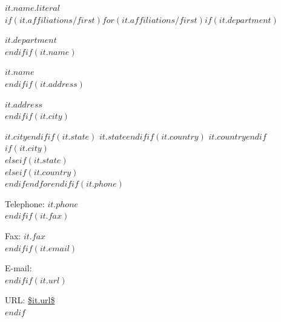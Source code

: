 $it.name.literal$\\$if(it.affiliations/first)$$for(it.affiliations/first)$$if(it.department)$

$it.department$\\$endif$$if(it.name)$

$it.name$\\$endif$$if(it.address)$

$it.address$\\$endif$$if(it.city)$

$it.city$$endif$$if(it.state)$ $it.state$$endif$$if(it.country)$ $it.country$$endif$$if(it.city)$\\$elseif(it.state)$\\$elseif(it.country)$\\$endif$$endfor$$endif$$if(it.phone)$

Telephone: $it.phone$\\$endif$$if(it.fax)$

Fax: $it.fax$\\$endif$$if(it.email)$

E-mail: \\$endif$$if(it.url)$

URL: \url{$it.url$}\\$endif$

\\~

